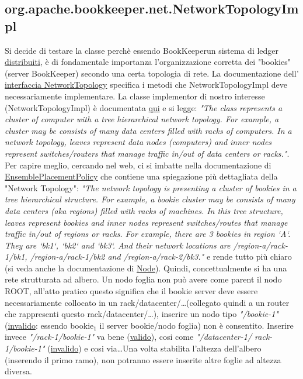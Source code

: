 \documentclass[10pt, a4paper]{article}
\def\bookkeeper{BookKeeper}
\begin{document}
	\subsection{org.apache.bookkeeper.net.NetworkTopologyImpl}
	Si decide di testare la classe perchè essendo \bookkeeper un sistema di ledger \underline{distribuiti}, è di fondamentale importanza l'organizzazione
	corretta dei "bookies" (server \bookkeeper) secondo una certa topologia di rete. La documentazione dell'
	\href{https://bookkeeper.apache.org/docs/latest/api/javadoc/org/apache/bookkeeper/net/NetworkTopology.html}{interfaccia NetworkTopology} specifica i
	metodi che NetworkTopologyImpl deve necessariamente implementare. La classe implementor di nostro interesse (NetworkTopologyImpl) è documentata 
	\href{https://bookkeeper.apache.org/docs/latest/api/javadoc/org/apache/bookkeeper/net/NetworkTopologyImpl.html}{qui} e si legge:
	\textit{"The class represents a cluster of computer with a tree hierarchical network topology. 
	For example, a cluster may be consists of many data centers filled with racks of computers. In a network topology, 
	leaves represent data nodes (computers) and inner nodes represent switches/routers that manage traffic in/out of data centers or racks."}.
	Per capire meglio, cercando nel web, ci si imbatte nella documentazione di 
	\href{https://bookkeeper.apache.org/docs/latest/api/javadoc/org/apache/bookkeeper/client/EnsemblePlacementPolicy.html}{EnsemblePlacementPolicy} 
	che contiene una spiegazione più dettagliata della "Network Topology": 
	\textit{"The network topology is presenting a cluster of bookies in a tree hierarchical structure. 
	For example, a bookie cluster may be consists of many data centers (aka regions) filled with racks of machines. 
	In this tree structure, leaves represent bookies and inner nodes represent switches/routes that manage traffic in/out of regions or racks.
	For example, there are 3 bookies in region `A`. They are `bk1`, `bk2` and `bk3`. And their network locations are /region-a/rack-1/bk1, 
	/region-a/rack-1/bk2 and /region-a/rack-2/bk3."} e rende tutto più chiaro (si veda anche la documentazione di \href{https://bookkeeper.apache.org/docs/latest/api/javadoc/org/apache/bookkeeper/net/Node.html}{Node}).
	Quindi, concettualmente si ha una rete strutturata ad albero.
	Un nodo foglia non può avere come parent il nodo ROOT, all'atto pratico questo significa che il bookie server deve essere necessariamente
	collocato in un rack/datacenter/\dots (collegato quindi a un router che rappresenti questo rack/datacenter/\dots), inserire un nodo tipo
	\textit{"/bookie-1"} (\underline{invalido}: essendo bookie$_1$ il server bookie/nodo foglia) non è consentito. 
	Inserire invece \textit{"/rack-1/bookie-1"} va bene (\underline{valido}), cosi come \textit{"/datacenter-1/
	rack-1/bookie-1"} (\underline{invalido}) e cosi via\dots Una volta stabilita l'altezza dell'albero (inserendo
	il primo ramo), non potranno essere inserite altre foglie ad altezza diversa.
\end{document}
